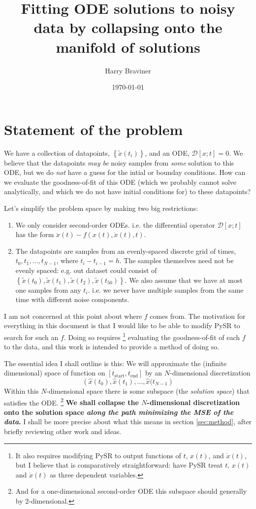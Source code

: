\documentclass{article}
\title{Fitting ODE solutions to noisy data by collapsing onto the manifold of solutions}
\author{Harry Braviner}
\date{\today}
\begin{document}
\maketitle

\section{Statement of the problem}

We have a collection of datapoints, $\left\{ \tilde{x}(t_i) \right\}$, and an ODE, $\mathcal{D}\left[ x; t \right] = 0$. We believe that the datapoints \emph{may be} noisy samples from \emph{some} solution to this ODE, but we do \emph{not} have a guess for the intial or bounday conditions. How can we evaluate the goodness-of-fit of this ODE (which we probably cannot solve analytically, and which we do not have initial conditions for) to these datapoints?

Let's simplify the problem space by making two big restrictions:
\begin{enumerate}
\item We only consider second-order ODEs. i.e. the differential operator $\mathcal{D}\left[x ; t \right]$ has the form $\ddot{x}(t) - f\left(x(t), \dot{x}(t), t\right)$.
\item The datapoints are samples from an evenly-spaced discrete grid of times, $t_0, t_1, \dots, t_{N-1}$, where $t_i - t_{i-1} = h$. The samples themselves need not be evenly spaced: e.g. out dataset could consist of $\left\{\tilde{x}(t_0), \tilde{x}(t_1), \tilde{x}(t_2), \tilde{x}(t_50)\right\}$. We also assume that we have at most one samples from any $t_i$. i.e. we never have multiple samples from the same time with different noise components.
\end{enumerate}

I am not concerned at this point about where $f$ comes from.
The motivation for everything in this document is that I would like to be able to modify PySR to search for such an $f$.
Doing so requires%
\footnote{It also requires modifying PySR to output functions of $t$, $x(t)$, and $\dot{x}(t)$, but I believe that is comparatively straightforward: have PySR treat $t$, $x(t)$ and $\dot{x}(t)$ as three dependent variables.}
evaluating the goodness-of-fit of each $f$ to the data, and this work is intended to provide a method of doing so.

The essential idea I shall outline is this: We will approximate the (infinite dimensional) space of function on $\left[t_{\mathrm{start}}, t_{\mathrm{end}} \right]$ by an $N$-dimensional discretization
$$
\left( \hat{x}(t_0), \hat{x}(t_1), \dots, \hat{x}(t_{N-1} \right)
$$
Within this $N$-dimensional space there is some subspace (the \emph{solution space}) that satisfies the ODE.%
\footnote{
And for a one-dimensional second-order ODE this subspace should generally by 2-dimensional.
}
\textbf{We shall collapse the $N$-dimensional discretization onto the solution space \emph{along the path minimizing the MSE of the data}.}
I shall be more precise about what this means in section \ref{sec:method}, after briefly reviewing other work and ideas.
\end{document}
